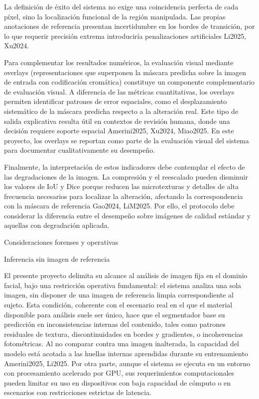 {{{La definición de éxito del sistema no exige una coincidencia perfecta de cada píxel, sino la localización funcional de la región manipulada. Las propias anotaciones de referencia presentan incertidumbre en los bordes de transición, por lo que requerir precisión extrema introduciría penalizaciones artificiales Li2025, Xu2024. 

Para complementar los resultados numéricos, la evaluación visual mediante overlays (representaciones que superponen la máscara predicha sobre la imagen de entrada con codificación cromática) constituye un componente complementario de evaluación visual. A diferencia de las métricas cuantitativas, los overlays permiten identificar patrones de error espaciales, como el desplazamiento sistemático de la máscara predicha respecto a la alteración real. Este tipo de salida explicativa resulta útil en contextos de revisión humana, donde una decisión requiere soporte espacial Amerini2025, Xu2024, Miao2025. En este proyecto, los overlays se reportan como parte de la evaluación visual del sistema para documentar cualitativamente su desempeño.

Finalmente, la interpretación de estos indicadores debe contemplar el efecto de las degradaciones de la imagen. La compresión y el reescalado pueden disminuir los valores de IoU y Dice porque reducen las microtexturas y detalles de alta frecuencia necesarios para localizar la alteración, afectando la correspondencia con la máscara de referencia Gao2024, LiM2025. Por ello, el protocolo debe considerar la diferencia entre el desempeño sobre imágenes de calidad estándar y aquellas con degradación aplicada.

Consideraciones forenses y operativas

Inferencia sin imagen de referencia

El presente proyecto delimita su alcance al análisis de imagen fija en el dominio facial, bajo una restricción operativa fundamental: el sistema analiza una sola imagen, sin disponer de una imagen de referencia limpia correspondiente al sujeto. Esta condición, coherente con el escenario real en el que el material disponible para análisis suele ser único, hace que el segmentador base su predicción en inconsistencias internas del contenido, tales como patrones residuales de textura, discontinuidades en bordes y gradientes, o incoherencias fotométricas. Al no comparar contra una imagen inalterada, la capacidad del modelo está acotada a las huellas internas aprendidas durante su entrenamiento Amerini2025, Li2025. Por otra parte, aunque el sistema se ejecuta en un entorno con procesamiento acelerado por GPU, sus requerimientos computacionales pueden limitar su uso en dispositivos con baja capacidad de cómputo o en escenarios con restricciones estrictas de latencia.

}}}
